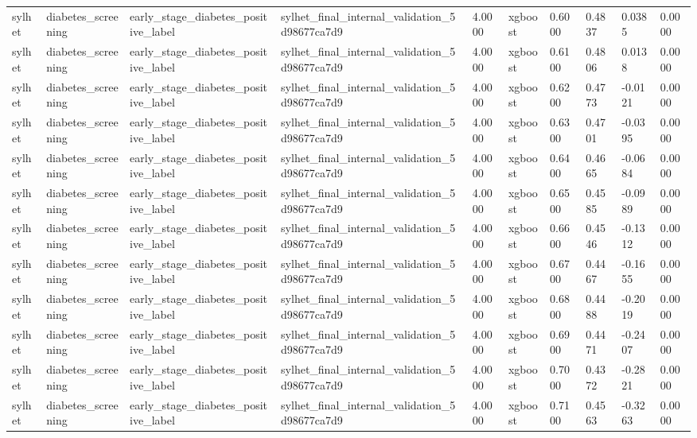 \begin{tabular}{llllllllll}
sylhet & diabetes\_screening & early\_stage\_diabetes\_positive\_label & sylhet\_final\_internal\_validation\_5d98677ca7d9 & 4.0000 & xgboost & 0.6000 & 0.4837 & 0.0385 & 0.0000 \\
sylhet & diabetes\_screening & early\_stage\_diabetes\_positive\_label & sylhet\_final\_internal\_validation\_5d98677ca7d9 & 4.0000 & xgboost & 0.6100 & 0.4806 & 0.0138 & 0.0000 \\
sylhet & diabetes\_screening & early\_stage\_diabetes\_positive\_label & sylhet\_final\_internal\_validation\_5d98677ca7d9 & 4.0000 & xgboost & 0.6200 & 0.4773 & -0.0121 & 0.0000 \\
sylhet & diabetes\_screening & early\_stage\_diabetes\_positive\_label & sylhet\_final\_internal\_validation\_5d98677ca7d9 & 4.0000 & xgboost & 0.6300 & 0.4701 & -0.0395 & 0.0000 \\
sylhet & diabetes\_screening & early\_stage\_diabetes\_positive\_label & sylhet\_final\_internal\_validation\_5d98677ca7d9 & 4.0000 & xgboost & 0.6400 & 0.4665 & -0.0684 & 0.0000 \\
sylhet & diabetes\_screening & early\_stage\_diabetes\_positive\_label & sylhet\_final\_internal\_validation\_5d98677ca7d9 & 4.0000 & xgboost & 0.6500 & 0.4585 & -0.0989 & 0.0000 \\
sylhet & diabetes\_screening & early\_stage\_diabetes\_positive\_label & sylhet\_final\_internal\_validation\_5d98677ca7d9 & 4.0000 & xgboost & 0.6600 & 0.4546 & -0.1312 & 0.0000 \\
sylhet & diabetes\_screening & early\_stage\_diabetes\_positive\_label & sylhet\_final\_internal\_validation\_5d98677ca7d9 & 4.0000 & xgboost & 0.6700 & 0.4467 & -0.1655 & 0.0000 \\
sylhet & diabetes\_screening & early\_stage\_diabetes\_positive\_label & sylhet\_final\_internal\_validation\_5d98677ca7d9 & 4.0000 & xgboost & 0.6800 & 0.4488 & -0.2019 & 0.0000 \\
sylhet & diabetes\_screening & early\_stage\_diabetes\_positive\_label & sylhet\_final\_internal\_validation\_5d98677ca7d9 & 4.0000 & xgboost & 0.6900 & 0.4471 & -0.2407 & 0.0000 \\
sylhet & diabetes\_screening & early\_stage\_diabetes\_positive\_label & sylhet\_final\_internal\_validation\_5d98677ca7d9 & 4.0000 & xgboost & 0.7000 & 0.4372 & -0.2821 & 0.0000 \\
sylhet & diabetes\_screening & early\_stage\_diabetes\_positive\_label & sylhet\_final\_internal\_validation\_5d98677ca7d9 & 4.0000 & xgboost & 0.7100 & 0.4563 & -0.3263 & 0.0000 \\

\end{tabular}

